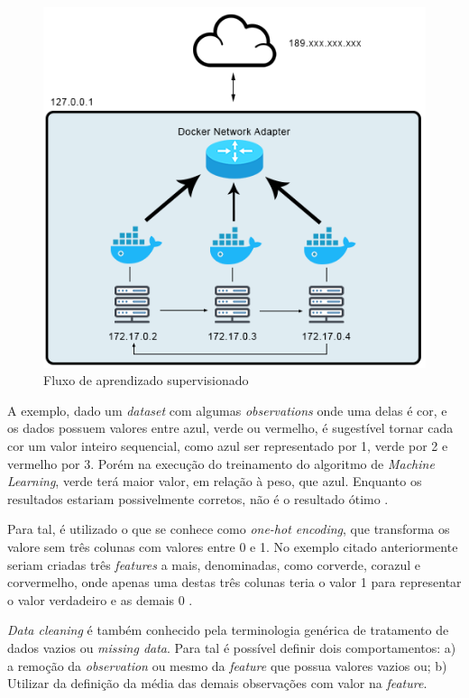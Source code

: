 \documentclass[conference]{IEEEtran}
\begin{document}
\begin{figure}[h]
\centerline{\includegraphics[width=1\linewidth]{figura3.png}}
\caption{Fluxo de aprendizado supervisionado \cite{pythonmachinelearning}}
\label{fig}
\end{figure}


A exemplo, dado um \textit{dataset} com algumas \textit{observations} onde uma delas é cor, e os dados possuem valores entre azul, verde ou vermelho, é sugestível tornar cada cor um valor inteiro sequencial, como azul ser representado por 1, verde por 2 e vermelho por 3. Porém na execução do treinamento do algoritmo de \textit{Machine Learning}, verde terá maior valor, em relação à peso, que azul. Enquanto os resultados estariam possivelmente corretos, não é o resultado ótimo \cite{pythonmachinelearning}. 


Para tal, é utilizado o que se conhece como \textit{one-hot encoding}, que transforma os valore sem três colunas com valores entre 0 e 1. No exemplo citado anteriormente seriam criadas três \textit{features} a mais, denominadas, como corverde, corazul e corvermelho, onde apenas uma destas três colunas teria o valor 1 para representar o valor verdadeiro e as demais 0 \cite{pythonmachinelearning}.

\textit{Data cleaning} é também conhecido pela terminologia genérica de tratamento de dados vazios ou \textit{missing data}. Para tal é possível definir dois comportamentos: a) a remoção da \textit{observation} ou mesmo da \textit{feature} que possua valores vazios ou; b) Utilizar da definição da média das demais observações com valor na \textit{feature}.
\end{document}
